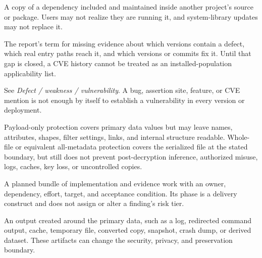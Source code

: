 \documentclass[../main.tex]{subfiles}
\begin{document}
\begin{description}[leftmargin=1.5em,style=nextline]
\item[Vendored library.]
A copy of a dependency included and maintained inside another project's source
or package. Users may not realize they are running it, and system-library
updates may not replace it.

\item[Version-and-path gap.]
The report's term for missing evidence about which versions contain a defect,
which real entry paths reach it, and which versions or commits fix it. Until
that gap is closed, a CVE history cannot be treated as an installed-population
applicability list.

\item[Vulnerability.]
See \emph{Defect / weakness / vulnerability}. A bug, assertion site, feature,
or CVE mention is not enough by itself to establish a vulnerability in every
version or deployment.

\item[Whole-file / payload-only protection.]
Payload-only protection covers primary data values but may leave names,
attributes, shapes, filter settings, links, and internal structure readable.
Whole-file or equivalent all-metadata protection covers the serialized file at
the stated boundary, but still does not prevent post-decryption inference,
authorized misuse, logs, caches, key loss, or uncontrolled copies.

\item[Work package / roadmap phase.]
A planned bundle of implementation and evidence work with an owner, dependency,
effort, target, and acceptance condition. Its phase is a delivery construct and
does not assign or alter a finding's risk tier.

\item[Workflow artifact.]
An output created around the primary data, such as a log, redirected command
output, cache, temporary file, converted copy, snapshot, crash dump, or derived
dataset. These artifacts can change the security, privacy, and preservation
boundary.

\end{description}
\end{document}
